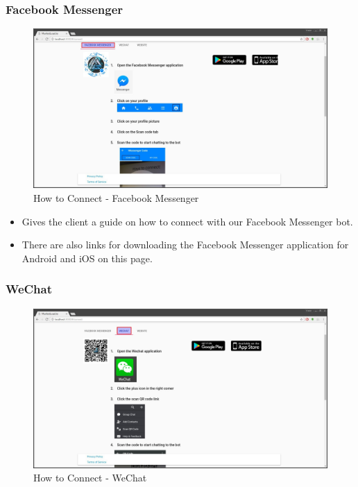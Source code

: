 \documentclass{article}
\begin{document}
			\subsubsection{Facebook Messenger}
				\begin{figure}[H]
					\includegraphics[width=\textwidth]{images/how_to_connect_facebook_messenger.jpg}
					\caption{How to Connect - Facebook Messenger}
				\end{figure}

				\begin{itemize}
					\item Gives the client a guide on how to connect with our Facebook Messenger bot.
					\item There are also links for downloading the Facebook Messenger application for Android and iOS on this page.
				\end{itemize}

			\subsubsection{WeChat}
				\begin{figure}[H]
					\includegraphics[width=\textwidth]{images/how_to_connect_wechat.jpg}
					\caption{How to Connect - WeChat}
				\end{figure}
\end{document}
